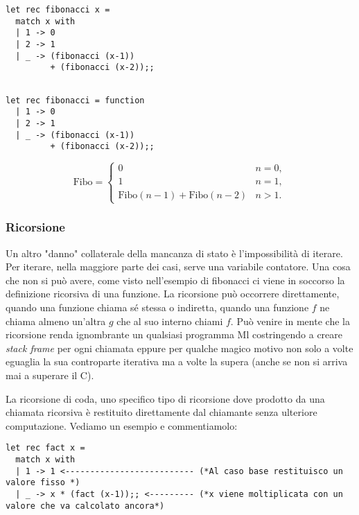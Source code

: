 \documentclass{article}
\begin{document}
\begin{minipage}{0.3\textwidth}
\begin{verbatim}
let rec fibonacci x = 
  match x with
  | 1 -> 0
  | 2 -> 1
  | _ -> (fibonacci (x-1)) 
         + (fibonacci (x-2));;
\end{verbatim}
\end{minipage}
\hfill
\begin{minipage}{0.3\textwidth}
\begin{verbatim}

let rec fibonacci = function
  | 1 -> 0
  | 2 -> 1
  | _ -> (fibonacci (x-1)) 
         + (fibonacci (x-2));;
\end{verbatim}
\end{minipage}
\begin{minipage}{0.3\textwidth}
\[
\text{Fibo} = {\scriptstyle
\begin{cases}
0 & n = 0, \\
1 & n = 1, \\
\text{Fibo}(n-1) + \text{Fibo}(n-2) & n > 1.
\end{cases}
}
\]
\end{minipage}

\subsubsection{Ricorsione}

\hspace*{0.5cm}Un altro "danno" collaterale della mancanza di stato è l'impossibilità di iterare. Per iterare, nella maggiore parte dei casi, serve una variabile contatore.
Una cosa che non si può avere, come visto nell'esempio di fibonacci ci viene in soccorso la definizione ricorsiva di una funzione.
La ricorsione può occorrere direttamente, quando una funzione chiama sé stessa o indiretta, quando una funzione $f$ ne chiama almeno un'altra $g$ che al suo interno chiami $f$.\newline
\hspace*{0.5cm}Può venire in mente che la ricorsione renda ignombrante un qualsiasi programma Ml costringendo a creare \textit{stack frame} per ogni chiamata eppure per qualche magico motivo non solo a volte eguaglia la sua controparte iterativa ma a volte la supera (anche se non si arriva mai a superare il C).

\vspace*{0.5cm}

\hspace*{0.5cm}La ricorsione di coda, uno specifico tipo di ricorsione dove prodotto da una chiamata ricorsiva è restituito direttamente dal chiamante senza ulteriore computazione.
Vediamo un esempio e commentiamolo:
\begin{verbatim}
let rec fact x = 
  match x with 
  | 1 -> 1 <-------------------------- (*Al caso base restituisco un valore fisso *)
  | _ -> x * (fact (x-1));; <--------- (*x viene moltiplicata con un valore che va calcolato ancora*)
\end{verbatim}
\end{document}

